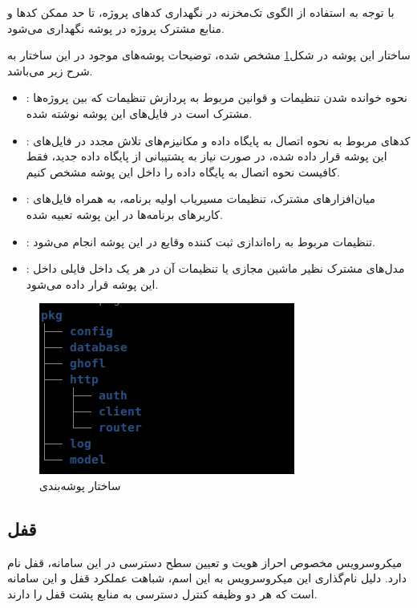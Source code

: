 با توجه به استفاده از الگوی تک‌مخزنه در نگهداری کد‌های پروژه، تا حد ممکن کد‌ها و منابع مشترک پروژه در پوشه  نگهداری می‌شود. 

ساختار این پوشه در شکل\ref{fig:pkg-dir} مشخص شده، توضیحات پوشه‌های موجود در این ساختار به شرح زیر می‌باشد.
\begin{itemize}
	\item {}: نحوه خوانده شدن تنظیمات و قوانین مربوط به پردازش تنظیمات که بین پروژه‌ها مشترک است در فایل‌های این پوشه نوشته شده.
	\item {}: کد‌های مربوط به نحوه اتصال به پایگاه داده و مکانیزم‌های تلاش مجدد در فایل‌های این پوشه قرار داده شده، در صورت نیاز به پشتیبانی از پایگاه داده جدید، فقط کافیست نحوه اتصال به پایگاه داده را داخل این پوشه مشخص کنیم.
	\item {}: میان‌افزارهای مشترک، تنظیمات مسیریاب اولیه برنامه، به همراه فایل‌های کاربر‌های برنامه‌ها در این پوشه تعبیه شده.
	\item {}: تنظیمات مربوط به راه‌اندازی ثبت کننده وقایع در این پوشه انجام می‌شود.
	\item {}: مدل‌های مشترک نظیر ماشین مجازی یا تنظیمات آن در هر یک داخل فایلی داخل این پوشه قرار داده می‌شود.
\end{itemize}

\begin{figure}
	\vspace{1cm}
	\centering
	\includegraphics[scale=0.55]{figures/pkg-dir.png}
	\caption{ساختار پوشه‌بندی }
	\label{fig:pkg-dir}
\end{figure}

\subsection{قفل}
میکروسرویس مخصوص احراز‌ هویت و تعیین سطح دسترسی در این سامانه، قفل نام دارد. دلیل نام‌گذاری این میکروسرویس به این اسم، شباهت عملکرد قفل و این سامانه است که هر دو وظیفه کنترل دسترسی به منابع پشت قفل را دارند.

